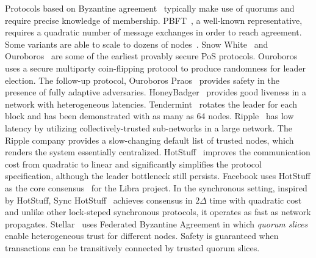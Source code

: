 {%
Protocols based on Byzantine agreement~\cite{PeaseSL80, LamportSP82} typically make use of
quorums and require precise knowledge of membership.
PBFT~\cite{castro1999practical, CL02}, a well-known representative, requires a quadratic number of message exchanges in order to
reach agreement. Some variants are able to scale to dozens of nodes~\cite{ClementWADM09, KotlaADCW09}.
Snow White~\cite{cryptoeprint:2016:919} and
Ouroboros~\cite{KiayiasRDO17} are some of the earliest provably secure PoS
protocols.  Ouroboros uses a secure multiparty coin-flipping protocol to
produce randomness for leader election. The follow-up protocol, Ouroboros
Praos~\cite{DavidGKR18} provides safety in the presence of fully adaptive
adversaries.
HoneyBadger~\cite{MillerXCSS16} provides good liveness in a network with heterogeneous latencies. %
Tendermint~\cite{buchman2016tendermint, 1807.04938} rotates the leader for each block
and has been demonstrated with as many as 64 nodes. Ripple~\cite{schwartz2014ripple} has low latency by utilizing collectively-trusted
sub-networks in a large network. The Ripple company provides a
slow-changing default list of trusted nodes, which renders the system essentially centralized.
HotStuff~\cite{hotstuff,hotstuffpodc} improves the communication cost from quadratic to linear and significantly simplifies the protocol specification, although the leader bottleneck still persists. Facebook uses HotStuff as the core consensus~\cite{librabft} for the Libra project.
In the synchronous setting, inspired by HotStuff, Sync HotStuff~\cite{synchotstuff} achieves consensus in $2\Delta$ time with quadratic cost and unlike other lock-steped synchronous protocols, it operates as fast as network propagates.
Stellar~\cite{mazieres2015stellar} uses Federated Byzantine Agreement in which \emph{quorum slices}
enable heterogeneous trust for different nodes.  Safety is guaranteed when
transactions can be transitively connected by trusted quorum slices.

}
